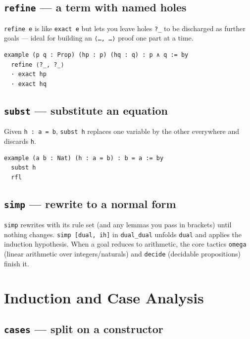 \documentclass[11pt, a4paper, oneside]{book}
\newcommand{\lc}[1]{\texttt{#1}}
\begin{document}
\subsection*{\lc{refine} --- a term with named holes}

\lc{refine e} is like \lc{exact e} but lets you leave holes \lc{?\_} to be
discharged as further goals --- ideal for building an \lc{⟨…, …⟩} proof one part
at a time.

\begin{leanbox}
\begin{verbatim}
example (p q : Prop) (hp : p) (hq : q) : p ∧ q := by
  refine ⟨?_, ?_⟩
  · exact hp
  · exact hq
\end{verbatim}
\end{leanbox}

\subsection*{\lc{subst} --- substitute an equation}

Given \lc{h : a = b}, \lc{subst h} replaces one variable by the other
everywhere and discards \lc{h}.

\begin{leanbox}
\begin{verbatim}
example (a b : Nat) (h : a = b) : b = a := by
  subst h
  rfl
\end{verbatim}
\end{leanbox}

\subsection*{\lc{simp} --- rewrite to a normal form}

\lc{simp} rewrites with its rule set (and any lemmas you pass in brackets)
until nothing changes. \lc{simp [dual, ih]} in \lc{dual\_dual} unfolds \lc{dual}
and applies the induction hypothesis. When a goal reduces to arithmetic, the
core tactics \lc{omega} (linear arithmetic over integers/naturals) and
\lc{decide} (decidable propositions) finish it.

\section*{Induction and Case Analysis}\label{sec:primer-induction}

\subsection*{\lc{cases} --- split on a constructor}
\end{document}
